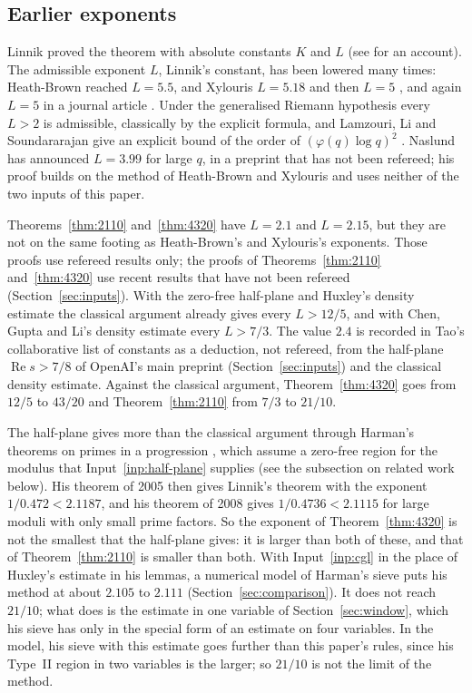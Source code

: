 \documentclass[11pt]{article}
\theoremstyle{definition}
\begin{document}
\subsection*{Earlier exponents}

Linnik \cite{linnik44, linnik44b} proved the theorem with absolute constants $K$ and $L$ (see
\cite[Chapter~18]{iwaniec-kowalski} for an account). The admissible exponent $L$, Linnik's constant, has been lowered
many times: Heath-Brown \cite{heath-brown92} reached $L = 5.5$, and Xylouris $L = 5.18$ \cite{xylouris-acta} and then
$L = 5$ \cite{xylouris11}, and again $L = 5$ in a journal article \cite{xylouris18}.
Under the generalised Riemann hypothesis every $L > 2$
is admissible, classically by the explicit formula, and Lamzouri, Li and Soundararajan give an explicit bound of the
order of $(\varphi(q) \log q)^2$ \cite{lls, lls-corr}. Naslund \cite{naslund} has announced $L = 3.99$ for large $q$,
in a preprint that has not been refereed; his proof builds on the method of Heath-Brown and Xylouris and uses neither
of the two inputs of this paper.

Theorems~\ref{thm:2110} and~\ref{thm:4320} have $L = 2.1$ and $L = 2.15$, but they are not on the same footing as
Heath-Brown's and Xylouris's exponents. Those proofs use refereed results only; the proofs of Theorems~\ref{thm:2110}
and~\ref{thm:4320} use recent results that have not been refereed (Section~\ref{sec:inputs}). With the zero-free
half-plane and Huxley's density estimate the classical argument already gives every $L > 12/5$, and with Chen, Gupta
and Li's density estimate every $L > 7/3$. The value $2.4$ is recorded in Tao's collaborative list of constants
\cite{tao-constants} as a deduction, not refereed, from the half-plane $\operatorname{Re} s > 7/8$ of OpenAI's main
preprint (Section~\ref{sec:inputs}) and the classical density estimate. Against the classical argument,
Theorem~\ref{thm:4320} goes from $12/5$ to $43/20$ and Theorem~\ref{thm:2110} from $7/3$ to $21/10$.

The half-plane gives more than the classical argument through Harman's theorems on primes in a progression
\cite{harman05, harman08}, which assume a zero-free region for the modulus that Input~\ref{inp:half-plane} supplies
(see the subsection on related work below). His theorem of 2005 then gives Linnik's theorem with the exponent
$1/0.472 < 2.1187$, and his theorem of 2008 gives $1/0.4736 < 2.1115$ for large moduli with only small prime
factors. So the exponent of Theorem~\ref{thm:4320} is not the smallest that the half-plane gives: it is larger than
both of these, and that of Theorem~\ref{thm:2110} is smaller than both. With Input~\ref{inp:cgl} in the place of
Huxley's estimate in his lemmas, a numerical model of Harman's sieve puts his method at about $2.105$ to $2.111$
(Section~\ref{sec:comparison}). It does not reach $21/10$; what does is the estimate in one variable of
Section~\ref{sec:window}, which his sieve has only in the special form of an estimate on four variables. In the
model, his sieve with this estimate goes further than this paper's rules, since his Type~II region in two variables
is the larger; so $21/10$ is not the limit of the method.
\end{document}
